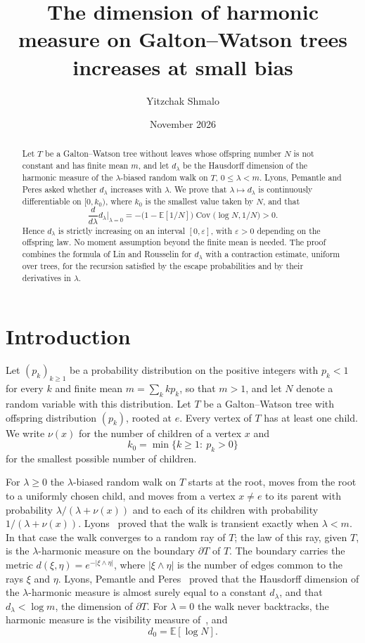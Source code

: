\documentclass[11pt]{amsart}
\title[Harmonic measure on Galton--Watson trees at small bias]{The dimension of harmonic measure on
Galton--Watson trees increases at small bias}
\author{Yitzchak Shmalo}
\date{November 2026}
\theoremstyle{definition}
\newcommand{\E}{\mathbb{E}}
\newcommand{\eps}{\varepsilon}
\newcommand{\Cov}{\operatorname{Cov}}
\begin{document}
\begin{abstract}
Let $T$ be a Galton--Watson tree without leaves whose offspring number $N$ is not constant and has finite mean
$m$, and let $d_\lambda$ be the Hausdorff dimension of the harmonic measure of the $\lambda$-biased random walk
on $T$, $0\le\lambda<m$. Lyons, Pemantle and Peres asked whether $d_\lambda$ increases with $\lambda$. We prove
that $\lambda\mapsto d_\lambda$ is continuously differentiable on $[0,k_0)$, where $k_0$ is the smallest value
taken by $N$, and that
\[
   \frac{d}{d\lambda}d_\lambda\Big|_{\lambda=0}=-\bigl(1-\E[1/N]\bigr)\Cov\bigl(\log N,1/N\bigr)>0 .
\]
Hence $d_\lambda$ is strictly increasing on an interval $[0,\eps]$, with $\eps>0$ depending on the offspring
law. No moment assumption beyond the finite mean is needed. The proof combines the formula of Lin and Rousselin
for $d_\lambda$ with a contraction estimate, uniform over trees, for the recursion satisfied by the escape
probabilities and by their derivatives in $\lambda$.
\end{abstract}
\maketitle

\section{Introduction}

Let $(p_k)_{k\ge1}$ be a probability distribution on the positive integers with $p_k<1$ for every $k$ and finite
mean $m=\sum_k kp_k$, so that $m>1$, and let $N$ denote a random variable with this distribution. Let $T$ be a
Galton--Watson tree with offspring distribution $(p_k)$, rooted at $e$. Every vertex of $T$ has at least one
child. We write $\nu(x)$ for the number of children of a vertex $x$ and
\[
   k_0=\min\{k\ge1:\ p_k>0\}
\]
for the smallest possible number of children.

For $\lambda\ge0$ the $\lambda$-biased random walk on $T$ starts at the root, moves from the root to a uniformly
chosen child, and moves from a vertex $x\ne e$ to its parent with probability $\lambda/(\lambda+\nu(x))$ and to
each of its children with probability $1/(\lambda+\nu(x))$. Lyons~\cite{Lyons90} proved that the walk is
transient exactly when $\lambda<m$. In that case the walk converges to a random ray of $T$; the law of this ray,
given $T$, is the $\lambda$-harmonic measure on the boundary $\partial T$ of $T$. The boundary carries the metric
$d(\xi,\eta)=e^{-|\xi\wedge\eta|}$, where $|\xi\wedge\eta|$ is the number of edges common to the rays $\xi$ and
$\eta$. Lyons, Pemantle and Peres~\cite{LPP95,LPP96} proved that the Hausdorff dimension of the
$\lambda$-harmonic measure is almost surely equal to a constant $d_\lambda$, and that $d_\lambda<\log m$, the
dimension of $\partial T$. For $\lambda=0$ the walk never backtracks, the harmonic measure is the visibility
measure of~\cite{LPP95}, and
\[
   d_0=\E[\log N].
\]
\end{document}

